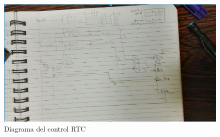 \documentclass[12pt,a4paper]{report}
\begin{document}
\begin{figure}[hbtp]
	\centering
	\includegraphics[width=16cm]{Img/ControlRTC1.jpg}
	\caption{Diagrama del control RTC}
	\label{fig:ControlRTC1}
\end{figure}
\end{document}
